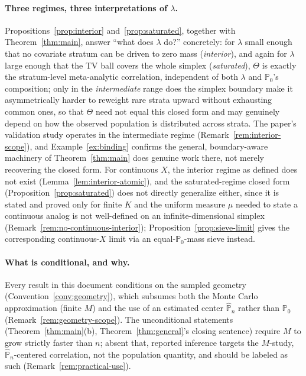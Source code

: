 \documentclass[11pt]{article}
\theoremstyle{plain}
\theoremstyle{definition}
\theoremstyle{remark}
\newcommand{\PP}{\mathbb{P}}
\newcommand{\Pn}{\widehat{\PP}_n}
\begin{document}
\paragraph{Three regimes, three interpretations of $\lambda$.} Propositions~\ref{prop:interior}
and~\ref{prop:saturated}, together with Theorem~\ref{thm:main}, answer ``what does
$\lambda$ do?'' concretely: for $\lambda$ small enough that no covariate stratum can
be driven to zero mass (\emph{interior}), and again for $\lambda$ large enough that
the TV ball covers the whole simplex (\emph{saturated}), $\Theta$ is exactly the
stratum-level meta-analytic correlation, independent of both $\lambda$ and $\PP_0$'s
composition; only in the \emph{intermediate} range does the simplex boundary make it
asymmetrically harder to reweight rare strata upward without exhausting common ones,
so that $\Theta$ need not equal this closed form and may genuinely depend on how the
observed population is distributed across strata. The paper's validation study
operates in the intermediate regime (Remark~\ref{rem:interior-scope}), and
Example~\ref{ex:binding} confirms the general, boundary-aware machinery of
Theorem~\ref{thm:main} does genuine work there, not merely recovering the closed
form. For continuous $X$, the interior regime as defined does not exist
(Lemma~\ref{lem:interior-atomic}), and the saturated-regime closed form
(Proposition~\ref{prop:saturated}) does not directly generalize either, since it is
stated and proved only for finite $K$ and the uniform measure $\mu$ needed to state
a continuous analog is not well-defined on an infinite-dimensional simplex
(Remark~\ref{rem:no-continuous-interior}); Proposition~\ref{prop:sieve-limit} gives
the corresponding continuous-$X$ limit via an equal-$\PP_0$-mass sieve instead.

\paragraph{What is conditional, and why.} Every result in this document conditions on
the sampled geometry (Convention~\ref{conv:geometry}), which subsumes both the
Monte Carlo approximation (finite $M$) and the use of an estimated center $\Pn$ rather
than $\PP_0$ (Remark~\ref{rem:geometry-scope}). The unconditional statements
(Theorem~\ref{thm:main}(b), Theorem~\ref{thm:general}'s closing sentence) require
$M$ to grow strictly faster than $n$; absent that, reported inference targets the
$M$-study, $\Pn$-centered correlation, not the population quantity, and should be
labeled as such (Remark~\ref{rem:practical-use}).
\end{document}
